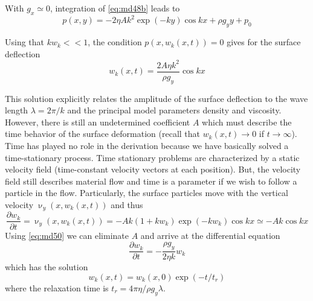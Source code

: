 With $g_x\simeq 0$, integration of \eqref{eq:md48b} leads to
\begin{equation}
p(x,y) = -2\eta A k^2 \exp (-ky) \cos kx + \rho g_y y + p_0
\label{eq:md49}
\end{equation} 

\vspace{0.5cm}
\vspace{0.5cm}

Using that $k w_k <<1$, the condition $p(x,w_k(x,t))=0$ gives for the surface deflection
\begin{equation}
w_k(x,t) = \frac{2A\eta k^2}{\rho g_y} \cos kx
\label{eq:md50}
\end{equation} 


This solution explicitly relates the amplitude of the surface deflection to the wave length
$\lambda = 2\pi/k$ and the principal model parameters density and viscosity. However, there is
still an undetermined coefficient $A$ which must describe the time behavior of the surface
deformation (recall that $w_k(x,t)\rightarrow 0$ if $t\rightarrow \infty$).
Time has played no role in the
derivation because we have basically solved a time-stationary process. Time stationary
problems are characterized by a static velocity field (time-constant velocity vectors at
each position). But, the velocity field still describes material flow and time is a parameter
if we wish to follow a particle in the flow. Particularly, the surface particles move with
the vertical velocity $\upnu_y(x,w_k(x,t))$ and thus
\begin{equation}
\frac{\partial w_k}{\partial t} = \upnu_y(x,w_k(x,t)) = -Ak(1+kw_k) \exp (-kw_k) \cos kx
\simeq -Ak \cos kx
\end{equation}
Using \eqref{eq:md50} we can eliminate $A$ and arrive at the differential equation
\begin{equation}
\frac{\partial w_k}{\partial t} = - \frac{\rho g_y}{2 \eta k} w_k
\label{eq:md51}
\end{equation}
which has the solution
\begin{equation}
w_k(x,t) = w_k(x,0) \exp( -t/t_r)
\label{eq:md52}
\end{equation}
where the relaxation time is $t_r= 4\pi \eta/\rho g_y \lambda$.

